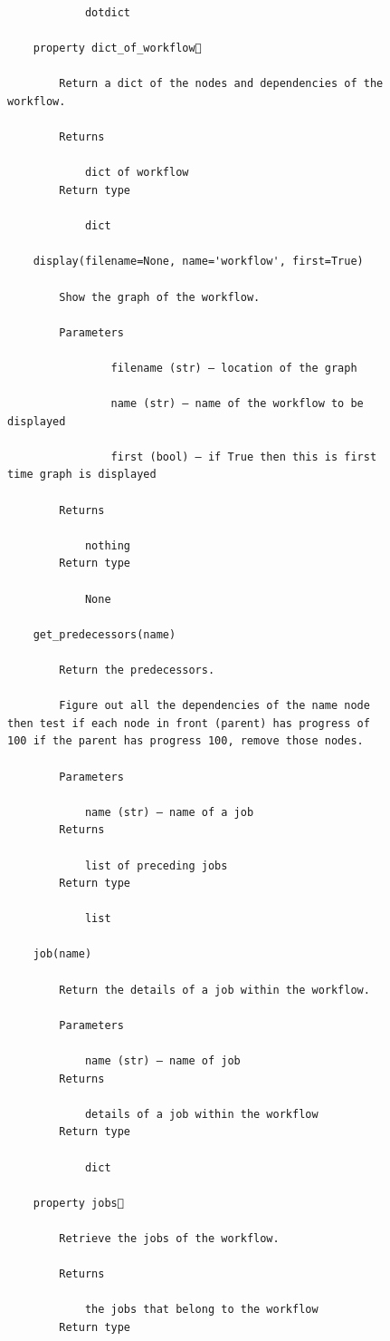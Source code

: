 \begin{figure}[htb]
\begin{verbatim}
            dotdict

    property dict_of_workflow

        Return a dict of the nodes and dependencies of the workflow.

        Returns

            dict of workflow
        Return type

            dict

    display(filename=None, name='workflow', first=True)

        Show the graph of the workflow.

        Parameters

                filename (str) – location of the graph

                name (str) – name of the workflow to be displayed

                first (bool) – if True then this is first time graph is displayed

        Returns

            nothing
        Return type

            None

    get_predecessors(name)

        Return the predecessors.

        Figure out all the dependencies of the name node then test if each node in front (parent) has progress of 100 if the parent has progress 100, remove those nodes.

        Parameters

            name (str) – name of a job
        Returns

            list of preceding jobs
        Return type

            list

    job(name)

        Return the details of a job within the workflow.

        Parameters

            name (str) – name of job
        Returns

            details of a job within the workflow
        Return type

            dict

    property jobs

        Retrieve the jobs of the workflow.

        Returns

            the jobs that belong to the workflow
        Return type


\end{verbatim}
\end{figure}
